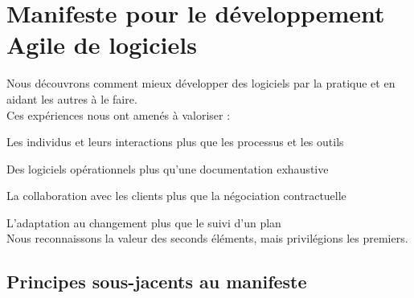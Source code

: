 \documentclass[11pt,a4paper]{article}
\begin{document}
\section*{Manifeste pour le développement Agile de logiciels}

Nous découvrons comment mieux développer des logiciels
par la pratique et en aidant les autres à le faire.
\\Ces expériences nous ont amenés à valoriser :
\vspace{5mm}

{\LARGE Les individus et leurs interactions} {\large plus que les processus et les outils}

{\LARGE Des logiciels opérationnels} {\large plus qu’une documentation exhaustive}

{\LARGE La collaboration avec les clients} {\large plus que la négociation contractuelle}

{\LARGE L’adaptation au changement} {\large plus que le suivi d’un plan}
\vspace{5mm}
~\\Nous reconnaissons la valeur des seconds éléments,
mais privilégions les premiers.


\subsection*{Principes sous-jacents au manifeste}
\end{document}
